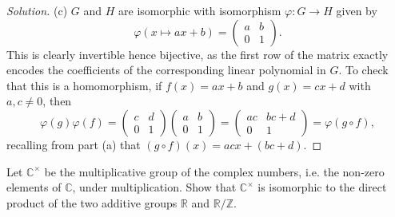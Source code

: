 \documentclass[11pt]{scrartcl}
\providecommand{\CC}{\mathbb C}
\providecommand{\RR}{\mathbb R}
\providecommand{\ZZ}{\mathbb Z}
\newenvironment{soln}{\begin{proof}[Solution]}{\end{proof}}
\begin{document}
\begin{soln}
    (c) $G$ and $H$ are isomorphic with isomorphism $\varphi\colon G\to H$ given by
    \begin{equation*}
        \varphi(x\mapsto ax+b) = \begin{pmatrix}
	    a&b\\0&1
        \end{pmatrix}.
    \end{equation*}
    This is clearly invertible hence bijective, as the first row of the matrix
    exactly encodes the coefficients of the corresponding linear polynomial in $G$.
    To check that this is a homomorphism, if $f(x) = ax+b$
    and $g(x) = cx+d$ with $a,c\ne0$, then
    \begin{equation*}
        \varphi(g)\varphi(f) = \begin{pmatrix}
	    c&d\\0&1
        \end{pmatrix}
	\begin{pmatrix}
	    a&b\\0&1
	\end{pmatrix} =
	\begin{pmatrix}
	    ac & bc+d \\ 0&1
	\end{pmatrix} =
	\varphi(g\circ f),
    \end{equation*}
    recalling from part (a) that $(g\circ f)(x) = acx + (bc + d)$.
\end{soln}

\begin{problem}
    Let $\CC^\times$ be the multiplicative group of the complex numbers,
    i.e. the non-zero elements of $\CC$, under multiplication.
    Show that $\CC^\times$ is isomorphic to the direct product
    of the two additive groups $\RR$ and $\RR/\ZZ$.
\end{problem}
\end{document}
